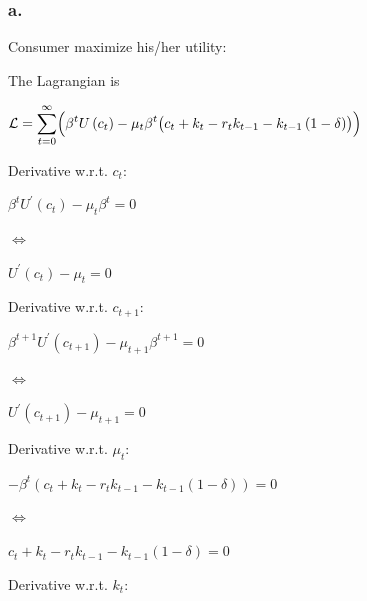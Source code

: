 \documentclass{article}
\begin{document}
\subsubsection*{\textrm{a.}}

Consumer maximize his/her utility:


The Lagrangian is

$\displaystyle \mathcal{L} =\sum_{t=0}^{\infty}\Bigl(\beta^{t}U\left(c_{t}\right)-\mu_{t}\beta^{t}\bigl(c_{t}+k_{t}-r_{t}k_{t-1}-k_{t-1}\left(1-\delta\right)\bigr)\Bigr)$

Derivative w.r.t. $c_{t}$:

$\beta^{t}U^{\prime}\left(c_{t}\right)-\mu_{t}\beta^{t}=0$

$\iff$

$U^{\prime}\left(c_{t}\right)-\mu_{t}=0$

Derivative w.r.t. $c_{t+1}$:

$\beta^{t+1}U^{\prime}\left(c_{t+1}\right)-\mu_{t+1}\beta^{t+1}=0$

$\iff$

$U^{\prime}\left(c_{t+1}\right)-\mu_{t+1}=0$

Derivative w.r.t. $\mu_{t}$:

$-\beta^{t}\left(c_{t}+k_{t}-r_{t}k_{t-1}-k_{t-1}\left(1-\delta\right)\right)=0$

$\iff$

$c_{t}+k_{t}-r_{t}k_{t-1}-k_{t-1}\left(1-\delta\right)=0$

Derivative w.r.t. $k_{t}$:
\end{document}
